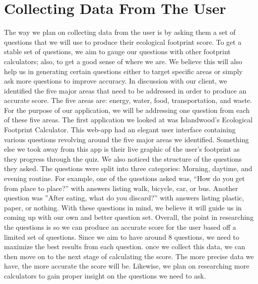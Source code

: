 \documentclass[onecolumn, draftclsnofoot,10pt, compsoc, tikz]{IEEEtran}
\begin{document}
\clearpage
\section{Collecting Data From The User}
The way we plan on collecting data from the user is by asking them a set of questions that we will use to produce their ecological footprint score. To get a stable set of questions, we aim to gauge our questions with other footprint calculators; also, to get a good sense of where we are. We believe this will also help us in generating certain questions either to target specific areas or simply ask more questions to improve accuracy. In discussion with our client, we identified the five major areas that need to be addressed in order to produce an accurate score. The five areas are: energy, water, food, transportation, and waste. For the purpose of our application, we will be addressing one question from each of these five areas. The first application we looked at was Islandwood’s Ecological Footprint Calculator. This web-app had an elegant user interface containing various questions revolving around the five major areas we identified. Something else we took away from this app is their live graphic of the user’s footprint as they progress through the quiz. We also noticed the structure of the questions they asked. The questions were split into three categories: Morning, daytime, and evening routine. For example, one of the questions asked was, “How do you get from place to place?” with answers listing walk, bicycle, car, or bus. Another question was ”After eating, what do you discard?” with answers listing plastic, paper, or nothing\cite{5}. With these questions in mind, we believe it will guide us in coming up with our own and better question set. Overall, the point in researching the questions is so we can produce an accurate score for the user based off a limited set of questions. Since we aim to have around 8 questions, we need to maximize the best results from each question. once we collect this data, we can then move on to the next stage of calculating the score. The more precise data we have, the more accurate the score will be. Likewise, we plan on researching more calculators to gain proper insight on the questions we need to ask.
\end{document}
